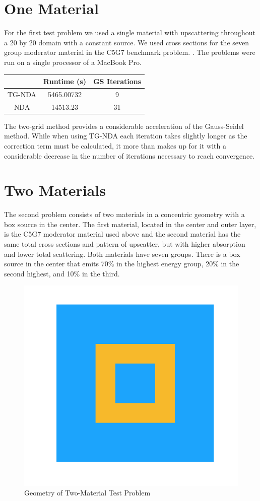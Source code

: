 \section{One Material}
For the first test problem we used a single material with  upscattering throughout a 20 by 20 domain with a constant source. We used cross sections for the seven group moderator material in the C5G7 benchmark problem. \cite{C5G7}.  
The problems were run on a single processor of a MacBook Pro. 
\begin{center}
    \begin{tabular}{|c|c|c|}
    \hline
    & Runtime (s) & GS Iterations \\
    \hline
    TG-NDA & 5465.00732 & 9 \\
    NDA & 14513.23 & 31 \\
    \hline
    \end{tabular}
\end{center}
The two-grid method provides a considerable acceleration of the Gauss-Seidel method. While when using TG-NDA each iteration takes slightly longer as the correction term must be calculated, it more than makes up for it with a considerable decrease in the number of iterations necessary to reach convergence. 
\section{Two Materials}
The second problem consists of two materials in a concentric geometry with a box source in the center. The first material, located in the center and outer layer, is the C5G7 moderator material used above and the second material has the same total cross sections and pattern of upscatter, but with higher absorption and lower total scattering. Both materials have seven groups. There is a box source in the center that emits 70\% in the highest energy group, 20\% in the second highest, and 10\% in the third.
\begin{figure}
    \centering
    \includegraphics[width=.3\textwidth]{fig/Geometry.png}
    \caption{Geometry of Two-Material Test Problem}
    \label{fig:test_geometry}
\end{figure}

